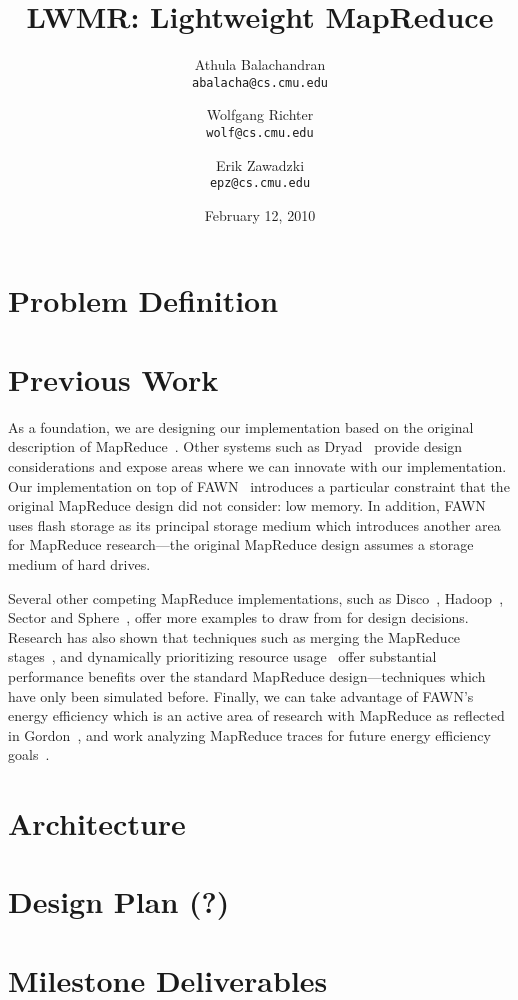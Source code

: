 \documentclass[10pt,letter,final,article,twocolumn]{article} %
\title{LWMR: Lightweight MapReduce}
\author{Athula Balachandran \\
{\tt abalacha@cs.cmu.edu}
\and
Wolfgang Richter \\
{\tt wolf@cs.cmu.edu}
\and
Erik Zawadzki \\
{\tt epz@cs.cmu.edu}}
\date{February 12, 2010} %
\begin{document}
\pagestyle{empty}
\maketitle
\thispagestyle{empty}

\section{Problem Definition}

\section{Previous Work}

As a foundation, we are designing our implementation based on the original 
description of MapReduce~\cite{mapreduce08}.  Other systems such as
Dryad~\cite{dryad07} provide design considerations and expose areas
where we can innovate with our implementation.  Our implementation on top
of FAWN~\cite{fawn09} introduces a particular constraint that the original
MapReduce design did not consider: low memory.  In addition, FAWN uses
flash storage as its principal storage medium which introduces another
area for MapReduce research---the original MapReduce design assumes a
storage medium of hard drives.  

Several other competing MapReduce implementations, such as
Disco~\cite{disco10}, Hadoop~\cite{hadoop10}, Sector and
Sphere~\cite{sphere09}, offer more examples to draw from for design
decisions.  Research has also shown that techniques such as merging the
MapReduce stages~\cite{barrier10}, and dynamically prioritizing resource
usage~\cite{sandholm09} offer substantial performance benefits over the
standard MapReduce design---techniques which have only been simulated
before.  Finally, we can take advantage of FAWN's energy efficiency which is
an active area of research with MapReduce as reflected in
Gordon~\cite{gordon09},  and work analyzing MapReduce traces for future
energy efficiency goals~\cite{chen10}.

\section{Architecture}

\section{Design Plan (?)}

\section{Milestone Deliverables}



\end{document}

